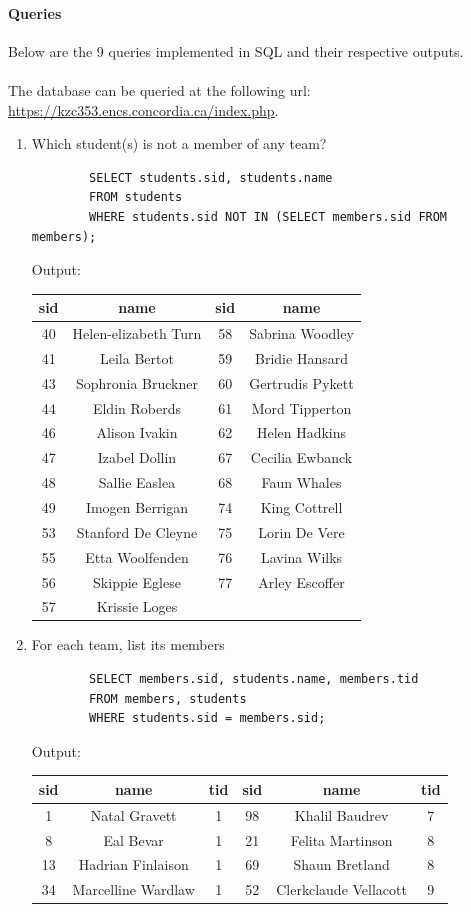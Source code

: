 \documentclass[11pt,letterpaper]{article}
\begin{document}
	\paragraph{Queries} Below are the 9 queries implemented in SQL and their respective outputs.\\
	\\
	The database can be queried at the following url: \url{https://kzc353.encs.concordia.ca/index.php}.
	\begin{enumerate}
		
		\item Which student(s) is not a member of any team?
		\begin{verbatim}
		SELECT students.sid, students.name
		FROM students
		WHERE students.sid NOT IN (SELECT members.sid FROM members);
		\end{verbatim}
		Output:
		\begin{center}
			\begin{tabular}{ | c  c | c  c | }
				\hline
				sid & name & sid & name\\
				\hline
				40 & Helen-elizabeth Turn & 58 & Sabrina Woodley \\
				41 & Leila Bertot & 59 & Bridie Hansard \\
				43 & Sophronia Bruckner & 60 & Gertrudis Pykett \\
				44 & Eldin Roberds & 61 & Mord Tipperton \\
				46 & Alison Ivakin & 62 & Helen Hadkins \\
				47 & Izabel Dollin & 67 & Cecilia Ewbanck \\
				48 & Sallie Easlea & 68 & Faun Whales \\
				49 & Imogen Berrigan & 74 & King Cottrell \\
				53 & Stanford De Cleyne & 75 & Lorin De Vere \\
				55 & Etta Woolfenden & 76 & Lavina Wilks \\
				56 & Skippie Eglese & 77 & Arley Escoffer \\
				57 & Krissie Loges &  & \\
				\hline
			\end{tabular}
		\end{center}
		
		\item For each team, list its members
		\begin{verbatim}
		SELECT members.sid, students.name, members.tid 
		FROM members, students 
		WHERE students.sid = members.sid;
		\end{verbatim}
		Output:
		\begin{center}
			\begin{tabular}{ | c  c  c |  c c c | }
				\hline
				sid & name & tid & sid & name & tid \\
				\hline
				1 & Natal Gravett & 1 & 98 & Khalil Baudrev & 7 \\
				8 & Eal Bevar & 1 & 21 & Felita Martinson & 8 \\
				13 & Hadrian Finlaison & 1 & 69 & Shaun Bretland & 8 \\
				34 & Marcelline Wardlaw & 1 & 52 & Clerkclaude Vellacott & 9 \\
				

\end{tabular}
\end{center}
\end{enumerate}
\end{document}
